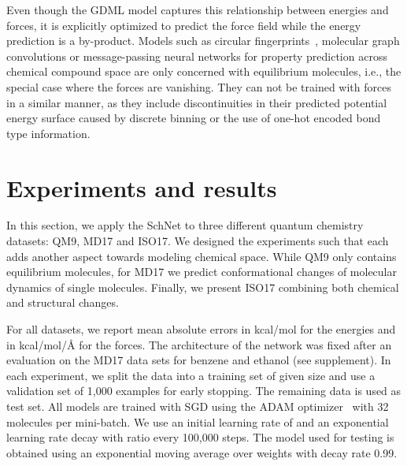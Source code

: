 \documentclass{article}
\begin{document}
Even though the GDML model captures this relationship between energies and forces, it is explicitly optimized to predict the force field while the energy prediction is a by-product.
Models such as circular fingerprints~\citep{duvenaud2015convolutional}, molecular graph convolutions or message-passing neural networks\citep{gilmer2017neural} for property prediction across chemical compound space are only concerned with equilibrium molecules, i.e., the special case where the forces are vanishing.
They can not be trained with forces in a similar manner, as they include discontinuities in their predicted potential energy surface caused by discrete binning or the use of one-hot encoded bond type information.

\section{Experiments and results}
In this section, we apply the SchNet to three different quantum chemistry datasets: QM9, MD17 and ISO17.
We designed the experiments such that each adds another aspect towards modeling chemical space.
While QM9 only contains equilibrium molecules, for MD17 we predict conformational changes of molecular dynamics of single molecules.
Finally, we present ISO17 combining both chemical and structural changes.

For all datasets, we report mean absolute errors in kcal/mol for the energies and in kcal/mol/{\AA} for the forces. The architecture of the network was fixed after an evaluation on the MD17 data sets for benzene and ethanol (see supplement).
In each experiment, we split the data into a training set of given size  and use a validation set of 1,000 examples for early stopping. The remaining data is used as test set.
All models are trained with SGD using the ADAM optimizer~\citep{KingmaB14} with 32 molecules per mini-batch.
We use an initial learning rate of  and an exponential learning rate decay with ratio  every 100,000 steps. The model used for testing is obtained using an exponential moving average over weights with decay rate 0.99.
\end{document}
